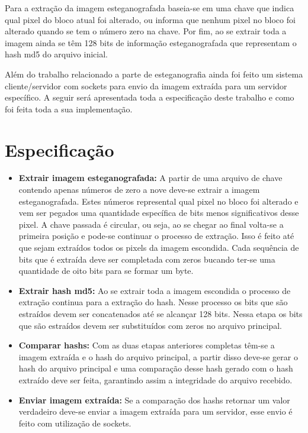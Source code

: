 \documentclass[journal,transmag]{IEEEtran}
\begin{document}
Para a extração da imagem esteganografada baseia-se em uma chave que indica qual pixel do bloco atual foi alterado, ou informa que nenhum pixel no bloco foi alterado quando se tem o número zero na chave. Por fim, ao se extrair toda a imagem ainda se têm 128 bits de informação esteganografada que representam o hash md5 do arquivo inicial.

Além do trabalho relacionado a parte de esteganografia ainda foi feito um sistema cliente/servidor com sockets para envio da imagem extraída para um servidor específico. A seguir será apresentada toda a especificação deste trabalho e como foi feita toda a sua implementação.

\section{Especificação}

\begin{itemize}
	\item \textbf{Extrair imagem esteganografada:} A partir de uma arquivo de chave contendo apenas números de zero a nove deve-se extrair a imagem esteganografada. Estes números represental qual pixel no bloco foi alterado e vem ser pegados uma quantidade específica de bits menos significativos desse pixel. A chave passada é circular, ou seja, ao se chegar ao final volta-se a primeira posição e pode-se continuar o processo de extração. Isso é feito até que sejam extraídos todos os pixels da imagem escondida. Cada sequência de bits que é extraída deve ser completada com zeros bucando ter-se uma quantidade de oito bits para se formar um byte.
	\item \textbf{Extrair hash md5:} Ao se extrair toda a imagem escondida o processo de extração continua para a extração do hash. Nesse processo os bits que são estraídos devem ser concatenados até se alcançar 128 bits. Nessa etapa os bits que são estraídos devem ser substituídos com zeros no arquivo principal.
	\item \textbf{Comparar hashs:} Com as duas etapas anteriores completas têm-se a imagem extraída e o hash do arquivo principal, a partir disso deve-se gerar o hash do arquivo principal e uma comparação desse hash gerado com o hash extraído deve ser feita, garantindo assim a integridade do arquivo recebido.
	\item \textbf{Enviar imagem extraída:} Se a comparação dos hashs retornar um valor verdadeiro deve-se enviar a imagem extraída para um servidor, esse envio é feito com utilização de sockets.
\end{itemize}
\end{document}
